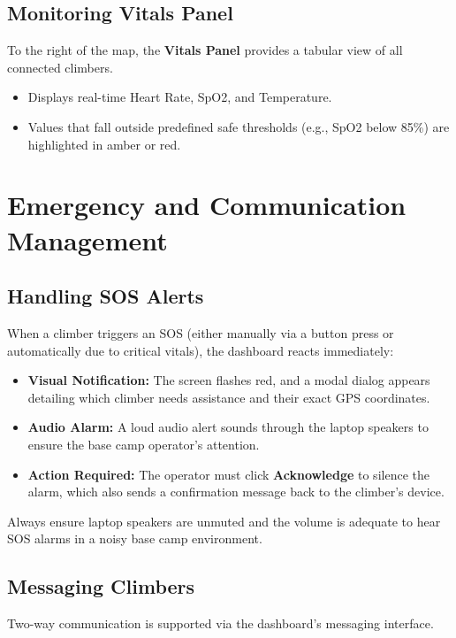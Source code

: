 \subsection{Monitoring Vitals Panel}
To the right of the map, the \textbf{Vitals Panel} provides a tabular view of all connected climbers.

\begin{itemize}
    \item Displays real-time Heart Rate, SpO2, and Temperature.
    \item Values that fall outside predefined safe thresholds (e.g., SpO2 below 85\%) are highlighted in amber or red.
\end{itemize}

\section{Emergency and Communication Management}

\subsection{Handling SOS Alerts}
When a climber triggers an SOS (either manually via a button press or automatically due to critical vitals), the dashboard reacts immediately:

\begin{itemize}
    \item \textbf{Visual Notification:} The screen flashes red, and a modal dialog appears detailing which climber needs assistance and their exact GPS coordinates.
    \item \textbf{Audio Alarm:} A loud audio alert sounds through the laptop speakers to ensure the base camp operator's attention.
    \item \textbf{Action Required:} The operator must click \textbf{Acknowledge} to silence the alarm, which also sends a confirmation message back to the climber's device.
\end{itemize}

\begin{cautionbox}
Always ensure laptop speakers are unmuted and the volume is adequate to hear SOS alarms in a noisy base camp environment.
\end{cautionbox}

\subsection{Messaging Climbers}
Two-way communication is supported via the dashboard's messaging interface.

